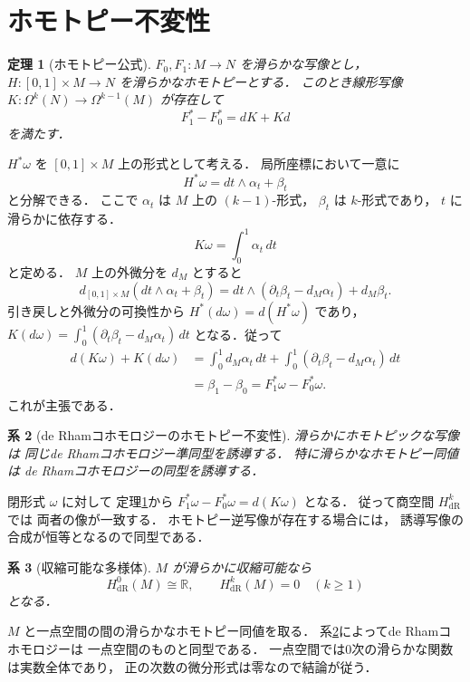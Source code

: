 \documentclass[a5paper,10pt,onecolumn]{jsarticle}
\makeatletter
\theoremstyle{mathnotetheorem}
\newtheorem{theorem}{定理}[section]
\newtheorem{corollary}[theorem]{系}
\renewcommand{\proofname}{証明}
\renewenvironment{proof}[1][\proofname]{%
  \par\pushQED{\qed}\normalfont\topsep4\p@\@plus2\p@\relax
  \trivlist\item[\hskip\labelsep\bfseries #1]\ignorespaces
}{\popQED\endtrivlist\@endpefalse}
\makeatother
\begin{document}
\section{ホモトピー不変性}

\begin{theorem}[ホモトピー公式]\label{thm:homotopy}
$F_0,F_1:M\to N$ を滑らかな写像とし，
$H:[0,1]\times M\to N$ を滑らかなホモトピーとする．
このとき線形写像
$K:\Omega^k(N)\to\Omega^{k-1}(M)$ が存在して
\[
 F_1^*-F_0^*=dK+Kd
\]
を満たす．
\end{theorem}
\begin{proof}
$H^*\omega$ を $[0,1]\times M$ 上の形式として考える．
局所座標において一意に
\[
 H^*\omega=dt\wedge\alpha_t+\beta_t
\]
と分解できる．
ここで $\alpha_t$ は $M$ 上の $(k-1)$-形式，
$\beta_t$ は $k$-形式であり，
$t$ に滑らかに依存する．
\[
 K\omega=\int_0^1\alpha_t\,dt
\]
と定める．
$M$ 上の外微分を $d_M$ とすると
\[
 d_{[0,1]\times M}(dt\wedge\alpha_t+\beta_t)
 =dt\wedge(\partial_t\beta_t-d_M\alpha_t)
 +d_M\beta_t.
\]
引き戻しと外微分の可換性から
$H^*(d\omega)=d(H^*\omega)$ であり，
$K(d\omega)=\int_0^1(\partial_t\beta_t-d_M\alpha_t)\,dt$
となる．従って
\begin{align*}
 d(K\omega)+K(d\omega)
 &=\int_0^1 d_M\alpha_t\,dt
   +\int_0^1(\partial_t\beta_t-d_M\alpha_t)\,dt\\
 &=\beta_1-\beta_0=F_1^*\omega-F_0^*\omega.
\end{align*}
これが主張である．
\end{proof}

\begin{corollary}[de Rhamコホモロジーのホモトピー不変性]
\label{cor:homotopy}
滑らかにホモトピックな写像は
同じde Rhamコホモロジー準同型を誘導する．
特に滑らかなホモトピー同値は
de Rhamコホモロジーの同型を誘導する．
\end{corollary}
\begin{proof}
閉形式 $\omega$ に対して
定理\ref{thm:homotopy}から
$F_1^*\omega-F_0^*\omega=d(K\omega)$
となる．
従って商空間 $H_{\mathrm{dR}}^k$ では
両者の像が一致する．
ホモトピー逆写像が存在する場合には，
誘導写像の合成が恒等となるので同型である．
\end{proof}

\begin{corollary}[収縮可能な多様体]\label{cor:contractible}
$M$ が滑らかに収縮可能なら
\[
 H_{\mathrm{dR}}^0(M)\cong\mathbb R,\qquad
 H_{\mathrm{dR}}^k(M)=0\quad(k\ge1)
\]
となる．
\end{corollary}
\begin{proof}
$M$ と一点空間の間の滑らかなホモトピー同値を取る．
系\ref{cor:homotopy}によってde Rhamコホモロジーは
一点空間のものと同型である．
一点空間では0次の滑らかな関数は実数全体であり，
正の次数の微分形式は零なので結論が従う．
\end{proof}
\end{document}
